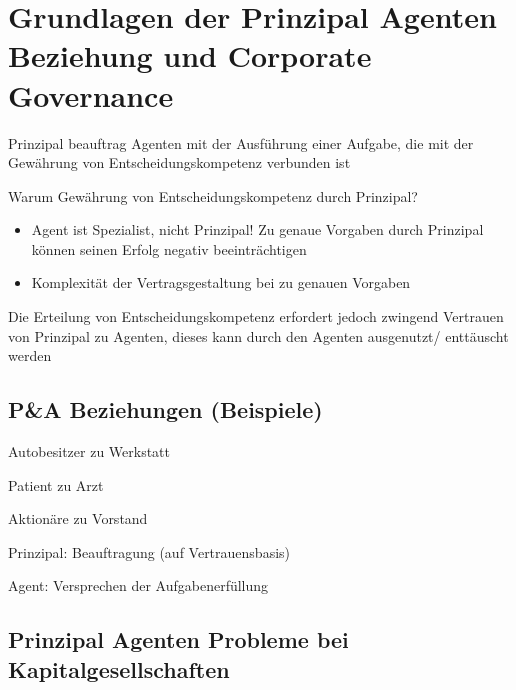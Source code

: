 \documentclass[
]{article}
\author{}
\date{\vspace{-2.5em}}
\providecommand{\tightlist}{%
  \setlength{\itemsep}{0pt}\setlength{\parskip}{0pt}}
\begin{document}
\hypertarget{grundlagen-der-prinzipal-agenten-beziehung-und-corporate-governance}{%
\section[Grundlagen der Prinzipal Agenten Beziehung und Corporate
Governance]{\texorpdfstring{\protect\hypertarget{anchor}{}{}Grundlagen
der Prinzipal Agenten Beziehung und Corporate
Governance}{Grundlagen der Prinzipal Agenten Beziehung und Corporate Governance}}\label{grundlagen-der-prinzipal-agenten-beziehung-und-corporate-governance}}

Prinzipal beauftrag Agenten mit der Ausführung einer Aufgabe, die mit
der Gewährung von Entscheidungskompetenz verbunden ist

Warum Gewährung von Entscheidungskompetenz durch Prinzipal?

\begin{itemize}
\tightlist
\item
  Agent ist Spezialist, nicht Prinzipal! Zu genaue Vorgaben durch
  Prinzipal können seinen Erfolg negativ beeinträchtigen
\item
  Komplexität der Vertragsgestaltung bei zu genauen Vorgaben
\end{itemize}

Die Erteilung von Entscheidungskompetenz erfordert jedoch zwingend
Vertrauen von Prinzipal zu Agenten, dieses kann durch den Agenten
ausgenutzt/ enttäuscht werden

\hypertarget{pa-beziehungen-beispiele}{%
\subsection{P\&A Beziehungen
(Beispiele)}\label{pa-beziehungen-beispiele}}

Autobesitzer zu Werkstatt

Patient zu Arzt

Aktionäre zu Vorstand

Prinzipal: Beauftragung (auf Vertrauensbasis)

Agent: Versprechen der Aufgabenerfüllung

\hypertarget{prinzipal-agenten-probleme-bei-kapitalgesellschaften}{%
\subsection{Prinzipal Agenten Probleme bei
Kapitalgesellschaften}\label{prinzipal-agenten-probleme-bei-kapitalgesellschaften}}
\end{document}
